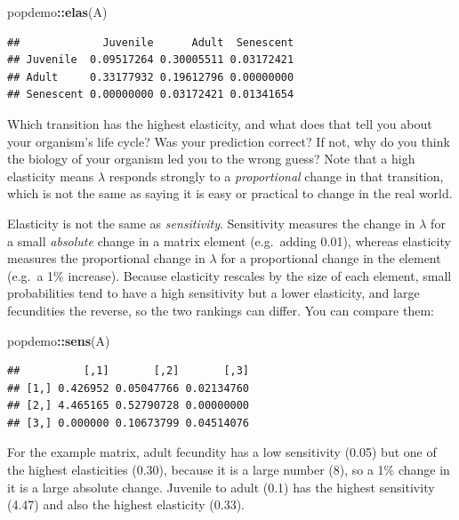 \documentclass[
  a4paper]{book}
\newenvironment{Shaded}{\begin{snugshade}}{\end{snugshade}}
\newcommand{\FunctionTok}[1]{\textcolor[rgb]{0.13,0.29,0.53}{\textbf{#1}}}
\newcommand{\NormalTok}[1]{#1}
\newcommand{\SpecialCharTok}[1]{\textcolor[rgb]{0.81,0.36,0.00}{\textbf{#1}}}
\begin{document}
\begin{Shaded}
\begin{Highlighting}[]
\NormalTok{popdemo}\SpecialCharTok{::}\FunctionTok{elas}\NormalTok{(A)}
\end{Highlighting}
\end{Shaded}

\begin{verbatim}
##             Juvenile      Adult  Senescent
## Juvenile  0.09517264 0.30005511 0.03172421
## Adult     0.33177932 0.19612796 0.00000000
## Senescent 0.00000000 0.03172421 0.01341654
\end{verbatim}

Which transition has the highest elasticity, and what does that tell you about your organism's life cycle? Was your prediction correct? If not, why do you think the biology of your organism led you to the wrong guess? Note that a high elasticity means \(\lambda\) responds strongly to a \emph{proportional} change in that transition, which is not the same as saying it is easy or practical to change in the real world.

Elasticity is not the same as \emph{sensitivity}. Sensitivity measures the change in \(\lambda\) for a small \emph{absolute} change in a matrix element (e.g.~adding 0.01), whereas elasticity measures the proportional change in \(\lambda\) for a proportional change in the element (e.g.~a 1\% increase). Because elasticity rescales by the size of each element, small probabilities tend to have a high sensitivity but a lower elasticity, and large fecundities the reverse, so the two rankings can differ. You can compare them:

\begin{Shaded}
\begin{Highlighting}[]
\NormalTok{popdemo}\SpecialCharTok{::}\FunctionTok{sens}\NormalTok{(A)}
\end{Highlighting}
\end{Shaded}

\begin{verbatim}
##          [,1]       [,2]       [,3]
## [1,] 0.426952 0.05047766 0.02134760
## [2,] 4.465165 0.52790728 0.00000000
## [3,] 0.000000 0.10673799 0.04514076
\end{verbatim}

For the example matrix, adult fecundity has a low sensitivity (0.05) but one of the highest elasticities (0.30), because it is a large number (8), so a 1\% change in it is a large absolute change. Juvenile to adult (0.1) has the highest sensitivity (4.47) and also the highest elasticity (0.33).
\end{document}
